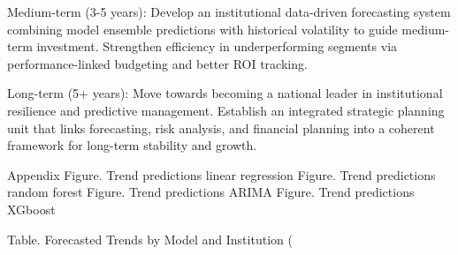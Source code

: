 Medium-term (3-5 years): Develop an institutional data-driven forecasting system combining model ensemble predictions with historical volatility to guide medium-term investment. Strengthen efficiency in underperforming segments via performance-linked budgeting and better ROI tracking.

Long-term (5+ years): Move towards becoming a national leader in institutional resilience and predictive management. Establish an integrated strategic planning unit that links forecasting, risk analysis, and financial planning into a coherent framework for long-term stability and growth.

Appendix
Figure. Trend predictions linear regression
Figure. Trend predictions random forest
Figure. Trend predictions ARIMA
Figure. Trend predictions XGboost


Table. Forecasted Trends by Model and Institution (%
